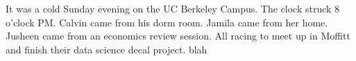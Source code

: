 \documentclass{article}
\begin{document}
It was a cold Sunday evening on the UC Berkeley Campus. The clock struck 8 o'clock PM. Calvin came from his dorm room. Jamila came from her home. Jusheen came from an economics review session. All racing to meet up in Moffitt and finish their data science decal project. blah
\end{document}
